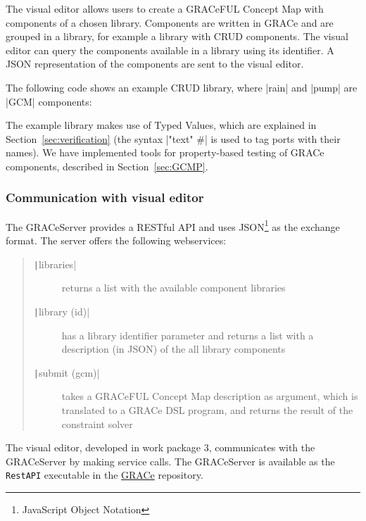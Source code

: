 \documentclass{article}
\newcommand{\haskell}[1]{\texttt|#1|}
\begin{document}
The visual editor allows users to create a GRACeFUL Concept Map with components
of a chosen library. Components are written in GRACe and are grouped in a
library, for example a library with CRUD components. The visual editor can query
the components available in a library using its identifier. A JSON
representation of the components are sent to the visual editor.

The following code shows an example CRUD library, where |rain| and |pump| are
|GCM| components:
The example library makes use of Typed Values, which are explained in
Section~\ref{sec:verification} (the syntax |"text" #| is used to tag
ports with their names).
%
We have implemented tools for property-based testing of GRACe components,
described in Section~\ref{sec:GCMP}.

\subsubsection*{Communication with visual editor}

The GRACeServer provides a RESTful API and uses JSON\footnote{JavaScript Object
Notation} as the exchange format. The server offers the following webservices:
\begin{quote}
\begin{description}
\item [\haskell{libraries}] returns a list with the available component libraries
\item [\haskell{library (id)}] has a library identifier parameter and returns
  a list with a description (in JSON) of the all library components
\item [\haskell{submit (gcm)}] takes a GRACeFUL Concept Map description as
  argument, which is translated to a GRACe DSL program, and returns the result
  of the constraint solver
\end{description}
\end{quote}
The visual editor, developed in work package 3, communicates with the GRACeServer
by making service calls. The GRACeServer is available as the \texttt{RestAPI}
executable in the \href{https://github.com/GRACeFUL-project/GRACe}{GRACe}
repository.
\end{document}
